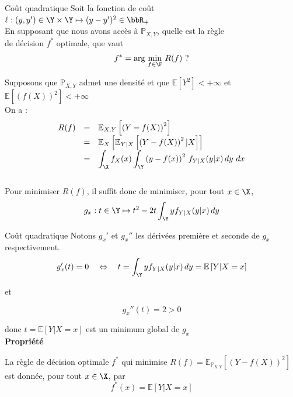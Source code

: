 \documentclass[10pt]{beamer}
\newcommand{\hsp}{\hspace*{1em}}
\begin{document}
\begin{frame}{Coût quadratique}
 \hsp Soit la fonction de coût $\ell : (y,y') \in \Y\times\Y \mapsto (y-y')^2 \in \bbR_+$\\\phantom{\bftitle{Question} \hsp}En supposant que nous avons accès à $\mathbb{P}_{X,Y}$, quelle est la règle\\\phantom{\bftitle{Question} \hsp}de décision $f^*$ optimale, \ie que vaut
$$ f^*= \text{arg}\,\min\limits_{f \in \F}\, R(f) \, \, ? $$ 

Supposons que $\mathbb{P}_{X,Y}$ admet une densité et que $\mathbb{E}\left[Y^2\right] < +\infty$ et $\mathbb{E}\left[\left(f(X)\right)^2\right] < +\infty$\\ [0.5em] On a :
\pause
$$
\begin{array}{lll}
	 R(f) &= &\mathbb{E}_{{X,Y}} \left[\left(Y-f(X)\right)^2\right]\\
	 & = &\mathbb{E}_{X} \left[\mathbb{E}_{Y|X} \left[\left(Y-f(X)\right)^2 \vert X\right]\right] \\[0.3em]
	 & = & \displaystyle \int_{\X} f_X(x) \int_{\Y} \left(y-f(x)\right)^2 \, f_{Y\vert X} (y\vert x) \, dy\ dx\\[1.5em]	 
\end{array}
$$

Pour minimiser $R(f)$, il suffit donc de minimiser, pour tout $x \in \X$, $$ g_x : t\in \Y \mapsto t^2 -2t \displaystyle \int_{\Y} y f_{Y\vert X} (y\vert x) \, dy$$ 

	 
\end{frame}



\begin{frame}{Coût quadratique}
Notons $g_x'$ et $g_x''$ les dérivées première et seconde de $g_x$ respectivement.\\[1em]
$$ g_x'(t) = 0  \hsp \Leftrightarrow \hsp t= \displaystyle \int_{\Y} y f_{Y\vert X} (y\vert x) \, dy = \mathbb{E} \left[Y \vert X=x\right] $$

et

$$g_x''(t) = 2 > 0$$

donc  $t=\mathbb{E} \left[Y \vert X=x\right] $ est un minimum global de $g_x$\\[2em]

		\textcolor{MPTred}{\large\textbf{Propriété}}
	\vspace*{-0.2em}	
	\begin{valblock}{}
		La règle de décision optimale $f^*$ qui minimise $R(f) = \mathbb{E}_{\mathbb{P}_{X,Y}} \left[\left(Y-f(X)\right)^2\right]$ est donnée, pour tout $x \in \X$, par 		
		$$ f^*(x) = \mathbb{E}\left[Y \vert X=x\right] $$	
		\vspace{-1.3em}	
	\end{valblock}
	
\end{frame}
\end{document}
